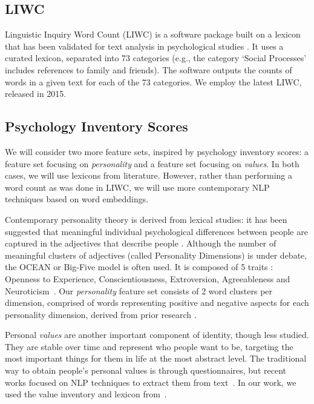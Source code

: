 \documentclass{article}
\begin{document}
\subsection{LIWC}\label{sec:featset:LIWC}
Linguistic Inquiry Word Count (LIWC) is a software package built on a lexicon that has been validated for text analysis in psychological studies \cite{pennebaker2015development}. It uses a curated lexicon, separated into 73 categories (e.g., the category `Social Processes' includes references to family and friends). The software outputs the counts of words in a given text for each of the 73 categories. We employ the latest LIWC, released in 2015. 

\subsection{Psychology Inventory Scores}\label{sec:featset:inventory_scores}

We will consider two more feature sets, inspired by psychology inventory scores: a feature set focusing on \emph{personality} and a feature set focusing on \emph{values}. In both cases, we will use lexicons from literature. However, rather than performing a word count as was done in LIWC, we will use more contemporary NLP techniques based on word embeddings.

Contemporary personality theory is derived from lexical studies: it has been suggested that meaningful individual psychological differences between people are captured in the adjectives that describe people \cite{goldberg1990alternative}. Although the number of meaningful clusters of adjectives (called Personality Dimensions) is under debate, the OCEAN or Big-Five model is often used. It is composed of 5 traits : Openness to Experience, Conscientiousness, Extroversion, Agreeableness and Neuroticism~\cite{goldberg1990alternative}. Our \emph{personality} feature set consists of 2 word clusters per dimension, comprised of words representing positive and negative aspects for each personality dimension, derived from prior research \cite{saucier1996evidence}.

Personal \emph{values} are another important component of identity, though less studied. They are stable over time and represent who people want to be, targeting the most important things for them in life at the most abstract level. The traditional way to obtain people's personal values is through questionnaires, but recent works focused on NLP techniques to extract them from text~\cite{wilson2016disentangling,wilson2018building,liu2019personality}. In our work, we used the value inventory and lexicon from~\cite{wilson2018building}. 
\end{document}
